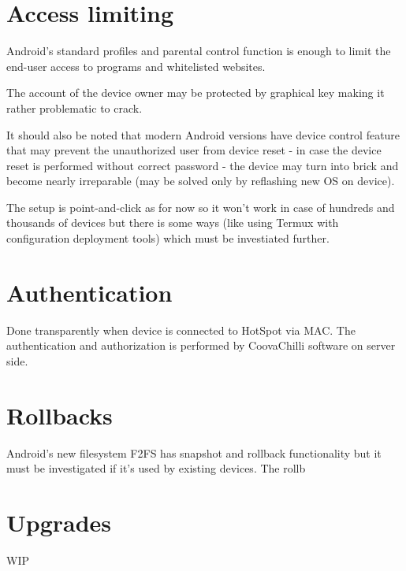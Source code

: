 \documentclass[a4paper, sans, booktabs, totpages, english]{report}
\begin{document}
\section{Access limiting}

Android's standard profiles and parental control function is enough to
limit the end-user access to programs and whitelisted websites.

The account of the device owner may be protected by graphical key
making it rather problematic to crack.

It should also be noted that modern Android versions have device control
feature that may prevent the unauthorized user from device reset -
in case the device reset is performed without correct password - the
device may turn into brick and become nearly irreparable (may be
solved only by reflashing new OS on device).

The setup is point-and-click as for now so it won't work in case of
hundreds and thousands of devices but there is some ways (like using
Termux with configuration deployment tools) which must be investiated
further.


\section{Authentication}

Done transparently when device is connected to HotSpot via MAC. The
authentication and authorization is performed by CoovaChilli software
on server side.


\section{Rollbacks}

Android's new filesystem F2FS has snapshot and rollback functionality
but it must be investigated if it's used by existing devices. The
rollb


\section{Upgrades}

WIP
\end{document}
